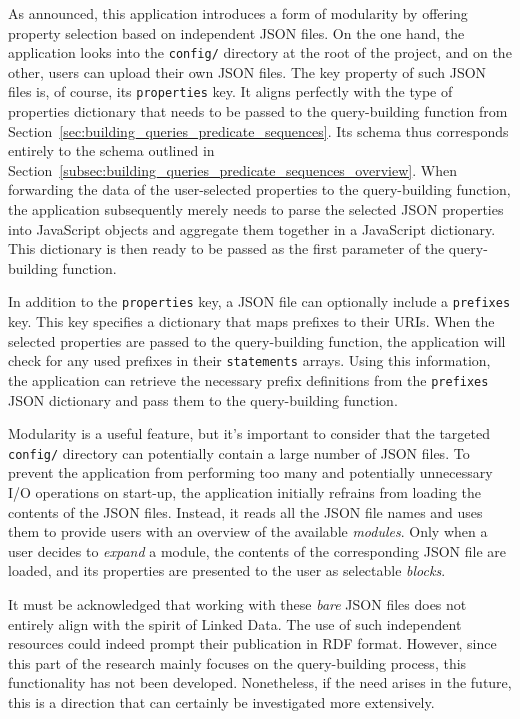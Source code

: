 As announced, this application introduces a form of modularity by offering property selection based on independent JSON files. On the one hand, the application looks into the \texttt{config/} directory at the root of the project, and on the other, users can upload their own JSON files. The key property of such JSON files is, of course, its \texttt{properties} key. It aligns perfectly with the type of properties dictionary that needs to be passed to the query-building function from Section~\ref{sec:building_queries_predicate_sequences}. Its schema thus corresponds entirely to the schema outlined in Section~\ref{subsec:building_queries_predicate_sequences_overview}. When forwarding the data of the user-selected properties to the query-building function, the application subsequently merely needs to parse the selected JSON properties into JavaScript objects and aggregate them together in a JavaScript dictionary. This dictionary is then ready to be passed as the first parameter of the query-building function.

In addition to the \texttt{properties} key, a JSON file can optionally include a \texttt{prefixes} key. This key specifies a dictionary that maps prefixes to their URIs. When the selected properties are passed to the query-building function, the application will check for any used prefixes in their \texttt{statements} arrays. Using this information, the application can retrieve the necessary prefix definitions from the \texttt{prefixes} JSON dictionary and pass them to the query-building function.

Modularity is a useful feature, but it's important to consider that the targeted \texttt{config/} directory can potentially contain a large number of JSON files. To prevent the application from performing too many and potentially unnecessary I/O operations on start-up, the application initially refrains from loading the contents of the JSON files. Instead, it reads all the JSON file names and uses them to provide users with an overview of the available \textit{modules}. Only when a user decides to \textit{expand} a module, the contents of the corresponding JSON file are loaded, and its properties are presented to the user as selectable \textit{blocks}.

It must be acknowledged that working with these \textit{bare} JSON files does not entirely align with the spirit of Linked Data. The use of such independent resources could indeed prompt their publication in RDF format. However, since this part of the research mainly focuses on the query-building process, this functionality has not been developed. Nonetheless, if the need arises in the future, this is a direction that can certainly be investigated more extensively.

